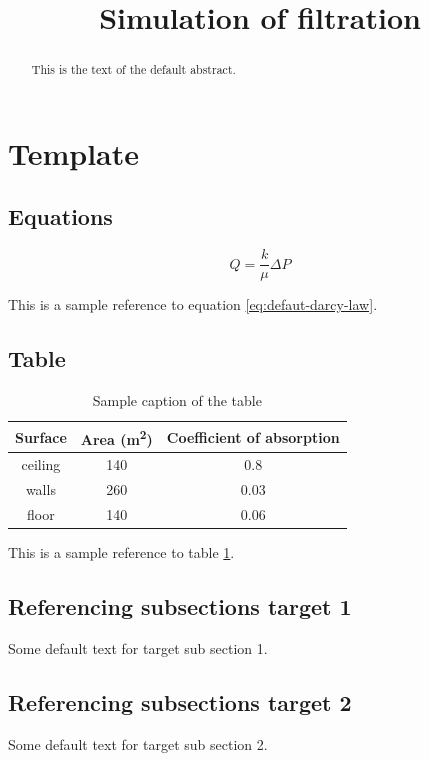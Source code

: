 \documentclass[
	11pt
] {article}
\author[1, 2]{\authFamilyFirst{} \authNameFirst{}}
\author[1]{\authFamilySecond{} \authNameSecond{}}
\author[1]{\authFamilyThird{} \authNameThird{}}
\affil[1]{Московский физико-технический институт, Долгопрудный, 141701}
\affil[2]{kafiulshabbir@phystech.edu}
\title{Simulation of filtration}
\begin{document}

\maketitle


\begin{abstract}
	This is the text of the default abstract.
\end{abstract}

\tableofcontents


\section{Template}
	\subsection{Equations}
		\begin{equation} \label{eq:defaut-darcy-law}
			Q = \frac{k}{\mu} \Delta P
		\end{equation}

		This is a sample reference to equation \ref{eq:defaut-darcy-law}.

	\subsection{Table}
		\begin{table}[H]
			\centering
			\caption{Sample caption of the table}
			\label{table:default-1}
			\begin{tabular}{| c | c | c |} %
				\hline
				Surface & Area (\si{\metre\squared}) & {Coefficient of absorption}\\
				\hline
				ceiling & 140 & 0.8 \\
				walls & 260 & 0.03 \\
				floor & 140 & 0.06 \\
				\hline
			\end{tabular}
		\end{table}

		This is a sample reference to table \ref{table:default-1}.

	\subsection{Referencing subsections target 1} \label{subsec:default-part-1}
		Some default text for target sub section 1.

	\subsection{Referencing subsections target 2}  \label{subsec:default-part-2}
		Some default text for target sub section 2.
\end{document}
